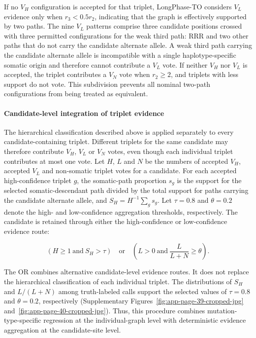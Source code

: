 \documentclass[pdflatex,sn-nature]{sn-jnl}
\begin{document}
If no \(V_H\) configuration is accepted for that triplet, LongPhase-TO considers \(V_L\) evidence only when \(r_3<0.5r_2\), indicating that the graph is effectively supported by two paths. The nine \(V_L\) patterns comprise three candidate positions crossed with three permitted configurations for the weak third path: RRR and two other paths that do not carry the candidate alternate allele. A weak third path carrying the candidate alternate allele is incompatible with a single haplotype-specific somatic origin and therefore cannot contribute a \(V_L\) vote. If neither \(V_H\) nor \(V_L\) is accepted, the triplet contributes a \(V_N\) vote when \(r_2\geq2\), and triplets with less support do not vote. This subdivision prevents all nominal two-path configurations from being treated as equivalent.

\paragraph{Candidate-level integration of triplet evidence}\label{pattern-artifact-filtering-using-a-somatic-path-ratio}

The hierarchical classification described above is applied separately to every candidate-containing triplet. Different triplets for the same candidate may therefore contribute \(V_H\), \(V_L\) or \(V_N\) votes, even though each individual triplet contributes at most one vote. Let \(H\), \(L\) and \(N\) be the numbers of accepted \(V_H\), accepted \(V_L\) and non-somatic triplet votes for a candidate. For each accepted high-confidence triplet \(g\), the somatic-path proportion \(s_g\) is the support for the selected somatic-descendant path divided by the total support for paths carrying the candidate alternate allele, and \(S_H=H^{-1}\sum_g s_g\). Let \(\tau=0.8\) and \(\theta=0.2\) denote the high- and low-confidence aggregation thresholds, respectively. The candidate is retained through either the high-confidence or low-confidence evidence route:

\[
\left(H\geq1\ \text{and}\ S_H>\tau\right)
\quad\text{or}\quad
\left(L>0\ \text{and}\ \frac{L}{L+N}\geq\theta\right).
\]

The OR combines alternative candidate-level evidence routes. It does not replace the hierarchical classification of each individual triplet. The distributions of \(S_H\) and \(L/(L+N)\) among truth-labeled calls support the selected values of \(\tau=0.8\) and \(\theta=0.2\), respectively (Supplementary Figures~\ref{fig:app-page-39-cropped-jpg} and~\ref{fig:app-page-40-cropped-jpg}). Thus, this procedure combines mutation-type-specific regression at the individual-graph level with deterministic evidence aggregation at the candidate-site level.
\end{document}
